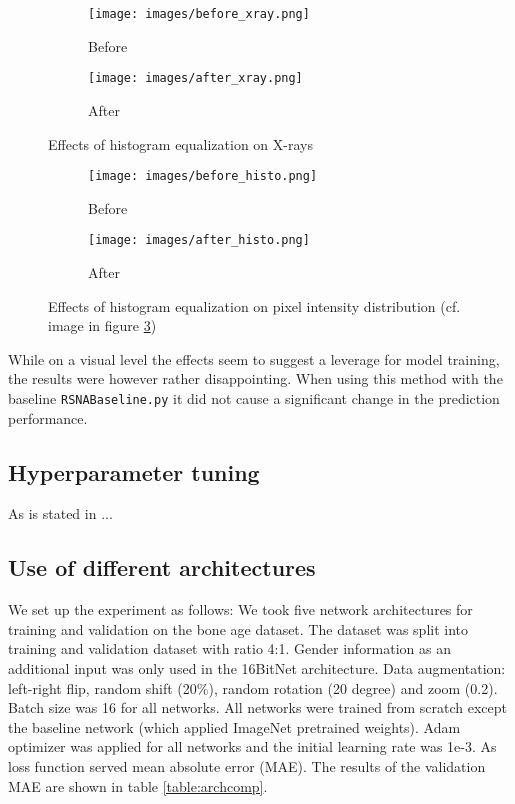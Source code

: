 \documentclass[10pt,twocolumn,letterpaper]{article}
\begin{document}
\begin{figure}[h]
\centering
\begin{subfigure}{0.2\textwidth}
\texttt{[image: images/before\_xray.png]} 
\caption{Before}
\label{fig:subim1}
\end{subfigure}
\begin{subfigure}{0.2\textwidth}
\texttt{[image: images/after\_xray.png]}
\caption{After}
\label{fig:subim2}
\end{subfigure}
\caption{Effects of histogram equalization on X-rays}
\label{fig:fighistx}
\end{figure}

\begin{figure}[h]
\centering
\begin{subfigure}{0.2\textwidth}
\texttt{[image: images/before\_histo.png]} 
\caption{Before}
\label{fig:subim1}
\end{subfigure}
\begin{subfigure}{0.2\textwidth}
\texttt{[image: images/after\_histo.png]}
\caption{After}
\label{fig:subim2}
\end{subfigure}
\caption{Effects of histogram equalization on pixel intensity distribution (cf. image in figure \ref{fig:fighistx})}
\label{fig:fighistd}
\end{figure}

While on a visual level the effects seem to suggest a leverage for model training, the results were however rather disappointing. When using this method with the baseline \verb+RSNABaseline.py+ it did not cause a significant change in the prediction performance.


\subsection{Hyperparameter tuning}
As is stated in \cite{1802.09596} ...

\subsection{Use of different architectures}
We set up the experiment as follows: We took five network architectures for training and validation on the bone age dataset. The dataset was split into training and validation dataset with ratio 4:1. Gender information as an additional input was only used in the 16BitNet architecture. Data augmentation: left-right flip, random shift (20\%), random rotation (20 degree) and zoom (0.2). Batch size was 16 for all networks. All networks were trained from scratch except the baseline network (which applied ImageNet pretrained weights). Adam optimizer was applied for all networks and the initial learning rate was 1e-3. As loss function served mean absolute error (MAE). The results of the validation MAE are shown in table \ref{table:archcomp}.
\end{document}
